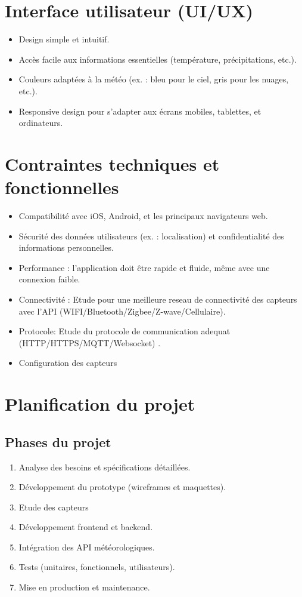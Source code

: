 \documentclass[a4paper,12pt]{article}
\begin{document}
\section{Interface utilisateur (UI/UX)}
\begin{itemize}
    \item Design simple et intuitif.
    \item Accès facile aux informations essentielles (température, précipitations, etc.).
    \item Couleurs adaptées à la météo (ex. : bleu pour le ciel, gris pour les nuages, etc.).
    \item Responsive design pour s'adapter aux écrans mobiles, tablettes, et ordinateurs.
\end{itemize}

\section{Contraintes techniques et fonctionnelles}
\begin{itemize}
    \item Compatibilité avec iOS, Android, et les principaux navigateurs web.
    \item Sécurité des données utilisateurs (ex. : localisation) et confidentialité des informations personnelles.
    \item Performance : l'application doit être rapide et fluide, même avec une connexion faible.
 \item Connectivité : Etude pour une meilleure reseau de connectivité des capteurs avec l'API (WIFI/Bluetooth/Zigbee/Z-wave/Cellulaire).
 \item Protocole: Etude du protocole de communication adequat (HTTP/HTTPS/MQTT/Websocket) .
 \item Configuration des capteurs
\end{itemize}

\section{Planification du projet}
\subsection{Phases du projet}
\begin{enumerate}
    \item Analyse des besoins et spécifications détaillées.
    \item Développement du prototype (wireframes et maquettes).
   \item Etude des capteurs
    \item Développement frontend et backend.
    \item Intégration des API météorologiques.
    \item Tests (unitaires, fonctionnels, utilisateurs).
    \item Mise en production et maintenance.
\end{enumerate}
\end{document}
